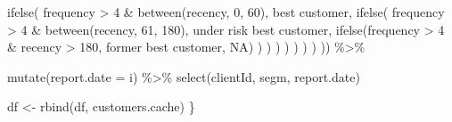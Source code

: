 \documentclass[
]{book}
\newenvironment{Shaded}{\begin{snugshade}}{\end{snugshade}}
\newcommand{\AttributeTok}[1]{\textcolor[rgb]{0.77,0.63,0.00}{#1}}
\newcommand{\ConstantTok}[1]{\textcolor[rgb]{0.00,0.00,0.00}{#1}}
\newcommand{\DecValTok}[1]{\textcolor[rgb]{0.00,0.00,0.81}{#1}}
\newcommand{\FunctionTok}[1]{\textcolor[rgb]{0.00,0.00,0.00}{#1}}
\newcommand{\NormalTok}[1]{#1}
\newcommand{\OtherTok}[1]{\textcolor[rgb]{0.56,0.35,0.01}{#1}}
\newcommand{\SpecialCharTok}[1]{\textcolor[rgb]{0.00,0.00,0.00}{#1}}
\newcommand{\StringTok}[1]{\textcolor[rgb]{0.31,0.60,0.02}{#1}}
\begin{document}
\begin{Shaded}
\begin{Highlighting}[]
                                           \FunctionTok{ifelse}\NormalTok{(}
\NormalTok{                                               frequency }\SpecialCharTok{\textgreater{}} \DecValTok{4} \SpecialCharTok{\&} \FunctionTok{between}\NormalTok{(recency, }\DecValTok{0}\NormalTok{, }\DecValTok{60}\NormalTok{),}
                                               \StringTok{\textquotesingle{}best customer\textquotesingle{}}\NormalTok{,}
                                               \FunctionTok{ifelse}\NormalTok{(}
\NormalTok{                                                   frequency }\SpecialCharTok{\textgreater{}} \DecValTok{4} \SpecialCharTok{\&}
                                                       \FunctionTok{between}\NormalTok{(recency, }\DecValTok{61}\NormalTok{, }\DecValTok{180}\NormalTok{),}
                                                   \StringTok{\textquotesingle{}under risk best customer\textquotesingle{}}\NormalTok{,}
                                                   \FunctionTok{ifelse}\NormalTok{(frequency }\SpecialCharTok{\textgreater{}} \DecValTok{4} \SpecialCharTok{\&}
\NormalTok{                                                              recency }\SpecialCharTok{\textgreater{}} \DecValTok{180}\NormalTok{, }\StringTok{\textquotesingle{}former best customer\textquotesingle{}}\NormalTok{, }\ConstantTok{NA}\NormalTok{)}
\NormalTok{                                               )}
\NormalTok{                                           )}
\NormalTok{                                       )}
\NormalTok{                                   )}
\NormalTok{                               )}
\NormalTok{                           )}
\NormalTok{                       )}
\NormalTok{                   )) }\SpecialCharTok{\%\textgreater{}\%}
        
        \FunctionTok{mutate}\NormalTok{(}\AttributeTok{report.date =}\NormalTok{ i) }\SpecialCharTok{\%\textgreater{}\%}
        \FunctionTok{select}\NormalTok{(clientId, segm, report.date)}
    
\NormalTok{    df }\OtherTok{\textless{}{-}} \FunctionTok{rbind}\NormalTok{(df, customers.cache)}
\NormalTok{\}}
\end{Highlighting}
\end{Shaded}
\end{document}
